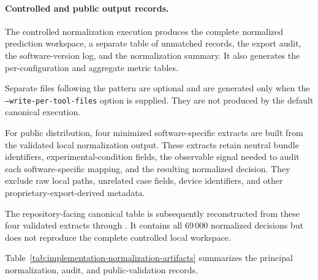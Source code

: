 \paragraph{Controlled and public output records.}

The controlled normalization execution produces the complete normalized
prediction workspace, a separate table of unmatched records, the export audit,
the software-version log, and the normalization summary. It also generates the
per-configuration and aggregate metric tables.

Separate files following the pattern
are optional and are generated only when the
\texttt{--write-per-tool-files} option is supplied. They are not produced by
the default canonical execution.

For public distribution, four minimized software-specific extracts are built
from the validated local normalization output. These extracts retain neutral
bundle identifiers, experimental-condition fields, the observable signal needed
to audit each software-specific mapping, and the resulting normalized decision.
They exclude raw local paths, unrelated case fields, device identifiers, and
other proprietary-export-derived metadata.

The repository-facing canonical table
 is subsequently
reconstructed from these four validated extracts through
.
It contains all 69\,000 normalized decisions but does not reproduce the complete
controlled local workspace.

Table~\ref{tab:implementation-normalization-artifacts} summarizes the principal
normalization, audit, and public-validation records.

